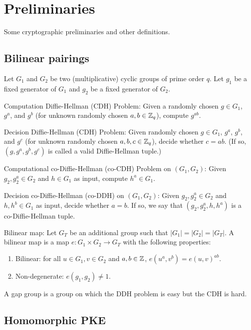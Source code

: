 \chapter{Preliminaries}

Some cryptographic preliminaries and other definitions.

\newpage

\section{Bilinear pairings}
\cite{DiHe76}

Let $G_1$ and $G_2$ be two (multiplicative) cyclic groups of prime order $q$. Let $g_1$ be a fixed generator of $G_1$ and $g_2$ be a fixed generator of $G_2$.

 Computation Diffie-Hellman (CDH) Problem: Given a randomly chosen $g \in G_1$, $g^a$, and $g^b$ (for unknown randomly chosen $a,b \in {\mathbb Z}_q$), compute $g^{ab}$.

 Decision Diffie-Hellman (CDH) Problem: Given randomly chosen $g \in G_1$, $g^a$, $g^b$, and $g^c$ (for unknown randomly chosen $a,b,c \in {\mathbb Z}_q$), decide whether $c = ab$. (If so, $(g, g^a, g^b, g^c)$ is called a valid Diffie-Hellman tuple.)

 Computational co-Diffie-Hellman (co-CDH) Problem on $(G_1, G_2)$: Given $g_2, g^a_2 \in G_2$ and $h \in G_1$ as input, compute $h^a \in G_1$.

 Decision co-Diffie-Hellman (co-DDH) on $(G_1, G_2)$: Given $g_2, g^a_2 \in G_2$ and $h, h^b \in G_1$ as input, decide whether $a=b$. If so, we say that $(g_2, g^a_2, h, h^a)$ is a co-Diffie-Hellman tuple.

 Bilinear map: Let $G_T$ be an additional group such that $ |G_1| = |G_2| = |G_T| $. A bilinear map is a map $e: G_1 \times G_2 \rightarrow G_T$ with the following properties:
\begin{enumerate}

\item Bilinear: for all $u \in G_1, v \in G_2$ and $a,b \in {\mathbb Z}$, $e(u^a, v^b) = e(u,v)^{ab}$.
\item Non-degenerate: $e(g_1, g_2) \neq 1$.

\end{enumerate}

 A gap group is a group on which the DDH problem is easy but the CDH is hard.

\newpage

\section{Homomorphic PKE}

